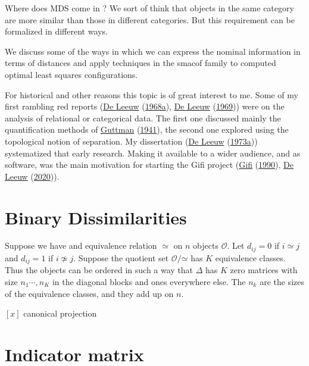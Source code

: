 \documentclass[
  12pt,
]{book}
\theoremstyle{definition}
\theoremstyle{definition}
\theoremstyle{definition}
\theoremstyle{definition}
\theoremstyle{remark}
\begin{document}
Where does MDS come in ? We sort of think that objects in the same category are more similar than those in different categories. But this requirement can be formalized in different ways.

We discuss some of the ways in which we can express the nominal information
in terms of distances and apply techniques in the smacof family to computed
optimal least squares configurations.

For historical and other reasons this topic is of great interest to me. Some of my first rambling red reports (\protect\hyperlink{ref-deleeuw_R_68e}{De Leeuw} (\protect\hyperlink{ref-deleeuw_R_68e}{1968a}), \protect\hyperlink{ref-deleeuw_R_69d}{De Leeuw} (\protect\hyperlink{ref-deleeuw_R_69d}{1969})) were on the analysis of relational or categorical data. The first one discussed mainly the quantification methods of \protect\hyperlink{ref-guttman_41}{Guttman} (\protect\hyperlink{ref-guttman_41}{1941}), the second one explored using the topological notion of separation. My dissertation (\protect\hyperlink{ref-deleeuw_B_73}{De Leeuw} (\protect\hyperlink{ref-deleeuw_B_73}{1973a})) systematized that early research. Making it available to a wider audience, and as software, was the main motivation for starting the Gifi project (\protect\hyperlink{ref-gifi_B_90}{Gifi} (\protect\hyperlink{ref-gifi_B_90}{1990}), \protect\hyperlink{ref-deleeuw_B_20}{De Leeuw} (\protect\hyperlink{ref-deleeuw_B_20}{2020})).

\hypertarget{binary-dissimilarities}{%
\section{Binary Dissimilarities}\label{binary-dissimilarities}}

Suppose we have and equivalence relation \(\simeq\) on \(n\) objects \(\mathcal{O}\). Let \(d_{ij}=0\) if \(i\simeq j\) and \(d_{ij}=1\) if \(i\not\simeq j\). Suppose the quotient set \(\mathcal{O}/\mathord{\simeq}\) has \(K\) equivalence classes. Thus the objects can be ordered in such a way that \(\Delta\) has
\(K\) zero matrices with size \(n_1\cdots, n_K\) in the diagonal blocks and
ones everywhere else. The \(n_k\) are the sizes of the equivalence classes, and they add up on \(n\).

\([x]\) canonical projection

\hypertarget{indicator-matrix}{%
\section{Indicator matrix}\label{indicator-matrix}}
\end{document}
